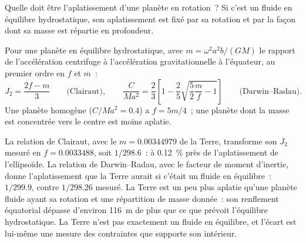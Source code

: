 Quelle doit être l'aplatissement d'une planète en rotation~? Si c'est un fluide en
équilibre hydrostatique, son aplatissement est fixé par sa rotation et par la façon dont sa masse
est répartie en profondeur.

\begin{proposition}\label{prop:b3:gravity-geodesy:clairaut}
Pour une planète en équilibre hydrostatique, avec $m = \omega^2a^2b/(GM)$ le rapport
de l'accélération centrifuge à l'accélération gravitationnelle à l'équateur, au premier
ordre en $f$ et $m$~:
\[
  J_2 = \frac{2f - m}{3}\qquad\text{(Clairaut)},\qquad
  \frac{C}{Ma^2} = \frac23\left[1 - \frac25\sqrt{\frac52\frac mf - 1}\right]
  \qquad\text{(Darwin--Radau)} .
\]
Une planète homogène ($C/Ma^2 = 0.4$) a $f = 5m/4$~; une planète dont la masse est
concentrée vers le centre est moins aplatie.
\end{proposition}
\admitted

La relation de Clairaut, avec le $m = \num{0.00344979}$ de la Terre, transforme son
$J_2$ mesuré en $f = \num{0.0033488}$, soit $1/298.6$~: à
\qty{0.12}{\percent} près de l'aplatissement de l'ellipsoïde. La relation de Darwin--Radau,
avec le facteur de moment d'inertie, donne l'aplatissement que la Terre aurait
si c'était un fluide en équilibre~: $1/299.9$, contre
$1/298.26$ mesuré. La Terre est un peu plus aplatie qu'une planète fluide ayant sa rotation
et une répartition de masse donnée~: son renflement équatorial dépasse d'environ
\qty{116}{m} de plus que ce que prévoit l'équilibre hydrostatique. La Terre n'est pas
exactement un fluide en équilibre, et l'écart est lui-même une
mesure des contraintes que supporte son intérieur.

